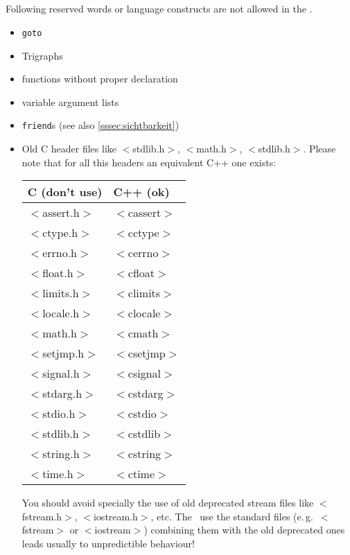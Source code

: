 \subsection{}

Following reserved words or language constructs are not allowed in the \ltilib.

\begin{itemize}
\item \verb+goto+
\item Trigraphs
\item functions without proper declaration
\item variable argument lists
\item \verb+friend+s (see also \ref{sssec:sichtbarkeit})
\item Old C header files like $<$stdlib.h$>$, $<$math.h$>$, $<$stdlib.h$>$. 
     Please note that for all this headers an equivalent C++ one exists:

     \begin{tabular}{|l|l|}
       \hline
       C ({\bf don't} use) & C++ (ok) \\
       \hline
       $<$assert.h$>$ & $<$cassert$>$ \\
       $<$ctype.h$>$ & $<$cctype$>$ \\
       $<$errno.h$>$ & $<$cerrno$>$ \\
       $<$float.h$>$ & $<$cfloat$>$ \\    
       $<$limits.h$>$ & $<$climits$>$ \\
       $<$locale.h$>$ & $<$clocale$>$ \\
       $<$math.h$>$ & $<$cmath$>$ \\
       $<$setjmp.h$>$ & $<$csetjmp$>$ \\
       $<$signal.h$>$ & $<$csignal$>$ \\
       $<$stdarg.h$>$ & $<$cstdarg$>$ \\
       $<$stdio.h$>$ & $<$cstdio$>$ \\
       $<$stdlib.h$>$ & $<$cstdlib$>$ \\
       $<$string.h$>$ & $<$cstring$>$ \\
       $<$time.h$>$ & $<$ctime$>$ \\
       \hline
     \end{tabular}
     
     You should avoid specially the use of old deprecated stream files like
     $<$fstream.h$>$, $<$iostream.h$>$, etc.  The \ltilib\ use the standard
     files (e.\,g.\ $<$fstream$>$ or $<$iostream$>$) combining them with the
     old deprecated ones leads usually to unpredictible behaviour!
\end{itemize}

